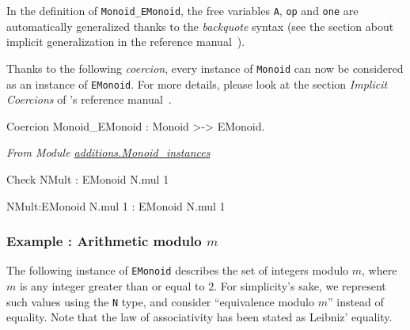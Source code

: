 \begin{remark}
In the definition of \texttt{Monoid\_EMonoid}, the free variables  \texttt{A}, 
\texttt{op} and \texttt{one} are automatically generalized thanks to the \emph{backquote} syntax (see the section about implicit generalization in the reference manual~\cite{Coq}).
\end{remark}

Thanks to the following \emph{coercion}, every instance of \texttt{Monoid} can 
now be considered as an instance of \texttt{EMonoid}. For more details, please look at the section \emph{Implicit Coercions} of \coq's reference manual~\cite{Coq}.






\begin{Coqsrc}
Coercion Monoid_EMonoid : Monoid >-> EMonoid.
\end{Coqsrc}


\emph{From Module \href{../theories/html/hydras.additions.Monoid_instances.html}{additions.Monoid\_instances}}

\begin{Coqsrc}
Check NMult : EMonoid  N.mul 1%
\end{Coqsrc}

\begin{Coqanswer}
  NMult:EMonoid N.mul 1%
     : EMonoid N.mul 1%
\end{Coqanswer}

\subsubsection{Example : Arithmetic  modulo $m$}

 
The following instance of \texttt{EMonoid} describes the set of integers modulo
$m$, where $m$ is any integer greater than or equal to $2$.
For simplicity's sake, we represent such values using the \texttt{N} type,
and consider ``equivalence modulo \texttt{$m$}'' instead of equality.
Note that the law of associativity has been stated as Leibniz' equality.


